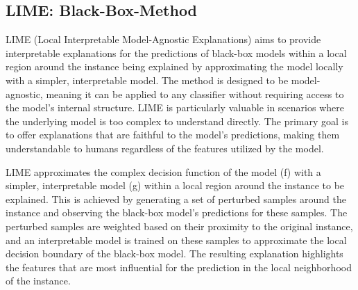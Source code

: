 \documentclass{article}
\begin{document}
\subsection{LIME: Black-Box-Method}

LIME (Local Interpretable Model-Agnostic Explanations) aims to provide interpretable explanations for the predictions of black-box models within a local region around the instance being explained by approximating the model locally with a simpler, interpretable model. The method is designed to be model-agnostic, meaning it can be applied to any classifier without requiring access to the model’s internal structure. LIME is particularly valuable in scenarios where the underlying model is too complex to understand directly. The primary goal is to offer explanations that are faithful to the model’s predictions, making them understandable to humans regardless of the features utilized by the model.

LIME approximates the complex decision function of the model (f) with a simpler, interpretable model (g) within a local region around the instance to be explained. This is achieved by generating a set of perturbed samples around the instance and observing the black-box model’s predictions for these samples. The perturbed samples are weighted based on their proximity to the original instance, and an interpretable model is trained on these samples to approximate the local decision boundary of the black-box model. The resulting explanation highlights the features that are most influential for the prediction in the local neighborhood of the instance.
\end{document}
